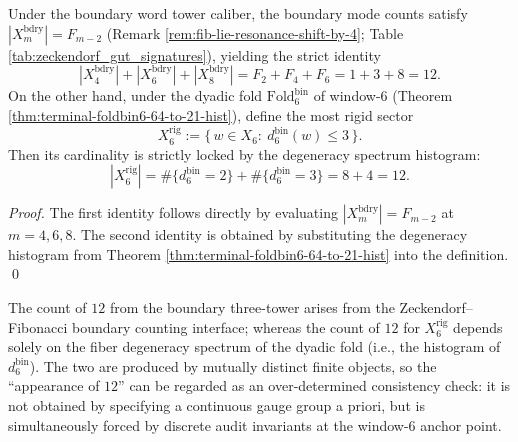 
\begin{corollary}\label{cor:window6-double-lock-12}
Under the boundary word tower caliber, the boundary mode counts satisfy \(|X_m^{\mathrm{bdry}}|=F_{m-2}\) (Remark \ref{rem:fib-lie-resonance-shift-by-4}; Table \ref{tab:zeckendorf_gut_signatures}), yielding the strict identity
\[
|X_4^{\mathrm{bdry}}|+|X_6^{\mathrm{bdry}}|+|X_8^{\mathrm{bdry}}|
=F_2+F_4+F_6
=1+3+8
=12.
\]
On the other hand, under the dyadic fold \(\mathrm{Fold}^{\mathrm{bin}}_6\) of window-\(6\) (Theorem \ref{thm:terminal-foldbin6-64-to-21-hist}), define the most rigid sector
\[
X_6^{\mathrm{rig}}
:=\{\,w\in X_6:\ d^{\mathrm{bin}}_6(w)\le 3\,\}.
\]
Then its cardinality is strictly locked by the degeneracy spectrum histogram:
\[
|X_6^{\mathrm{rig}}|
=\#\{d^{\mathrm{bin}}_6=2\}+\#\{d^{\mathrm{bin}}_6=3\}
=8+4
=12.
\]
\end{corollary}
\begin{proof}
The first identity follows directly by evaluating \(|X_m^{\mathrm{bdry}}|=F_{m-2}\) at \(m=4,6,8\).
The second identity is obtained by substituting the degeneracy histogram from Theorem \ref{thm:terminal-foldbin6-64-to-21-hist} into the definition. \qed
\end{proof}

\begin{remark}\label{rem:window6-double-lock-12-independent}
The count of \(12\) from the boundary three-tower arises from the Zeckendorf--Fibonacci boundary counting interface; whereas the count of \(12\) for \(X_6^{\mathrm{rig}}\) depends solely on the fiber degeneracy spectrum of the dyadic fold (i.e., the histogram of \(d^{\mathrm{bin}}_6\)).
The two are produced by mutually distinct finite objects, so the ``appearance of \(12\)'' can be regarded as an over-determined consistency check: it is not obtained by specifying a continuous gauge group a priori, but is simultaneously forced by discrete audit invariants at the window-\(6\) anchor point.
\end{remark}

\endinput
